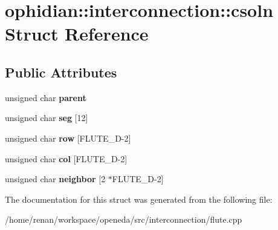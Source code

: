 \hypertarget{structophidian_1_1interconnection_1_1csoln}{\section{ophidian\-:\-:interconnection\-:\-:csoln Struct Reference}
\label{structophidian_1_1interconnection_1_1csoln}
}
\subsection*{Public Attributes}
\begin{DoxyCompactItemize}
\item 
\hypertarget{structophidian_1_1interconnection_1_1csoln_a018023339abcda04061237c4edd154bb}{unsigned char {\bfseries parent}}\label{structophidian_1_1interconnection_1_1csoln_a018023339abcda04061237c4edd154bb}

\item 
\hypertarget{structophidian_1_1interconnection_1_1csoln_a97d481e5d83ba97bd63ce1536ecbea7d}{unsigned char {\bfseries seg} \mbox{[}12\mbox{]}}\label{structophidian_1_1interconnection_1_1csoln_a97d481e5d83ba97bd63ce1536ecbea7d}

\item 
\hypertarget{structophidian_1_1interconnection_1_1csoln_aa6b0adf958ad9134858b6f34e8300ee4}{unsigned char {\bfseries row} \mbox{[}F\-L\-U\-T\-E\-\_\-\-D-\/2\mbox{]}}\label{structophidian_1_1interconnection_1_1csoln_aa6b0adf958ad9134858b6f34e8300ee4}

\item 
\hypertarget{structophidian_1_1interconnection_1_1csoln_a096d47c00ce69d45b19253061ac92ed7}{unsigned char {\bfseries col} \mbox{[}F\-L\-U\-T\-E\-\_\-\-D-\/2\mbox{]}}\label{structophidian_1_1interconnection_1_1csoln_a096d47c00ce69d45b19253061ac92ed7}

\item 
\hypertarget{structophidian_1_1interconnection_1_1csoln_ac30c24099e70c390811c1031a7bc7790}{unsigned char {\bfseries neighbor} \mbox{[}2 $\ast$F\-L\-U\-T\-E\-\_\-\-D-\/2\mbox{]}}\label{structophidian_1_1interconnection_1_1csoln_ac30c24099e70c390811c1031a7bc7790}

\end{DoxyCompactItemize}


The documentation for this struct was generated from the following file\-:\begin{DoxyCompactItemize}
\item 
/home/renan/workspace/openeda/src/interconnection/flute.\-cpp\end{DoxyCompactItemize}
